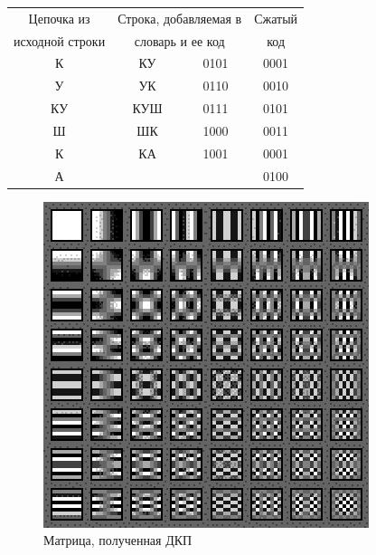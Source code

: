 \begin{table}[H]
\begin{center}
	\begin{tabular}{|c|c|c|c|}
		\hline	
		  Цепочка из & \multicolumn{2}{|c|}{Строка, добавляемая в} & Сжатый \\
		  исходной строки & \multicolumn{2}{|c|}{словарь и ее код} & код \\
		\hline
	  	  К    & КУ & 0101 & 0001 \\
		\hline
		  У	   & УК & 0110 & 0010 \\
		\hline  
		  КУ   & КУШ & 0111 & 0101 \\
		\hline  	
		  Ш    & ШК & 1000 & 0011 \\
		\hline
		  К    & КА & 1001 & 0001 \\
		\hline
		  А    &    &      & 0100 \\
		\hline
	\end{tabular}
\end{center}
\end{table}

\begin{figure}[H]
	\begin{center}
		\includegraphics[scale=1]{../pics/cosine_transform/matrix.png}
		\caption{Матрица, полученная ДКП}
		\label{pic:cosine_tranform:matrix}
	\end{center}
\end{figure}



